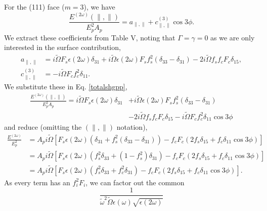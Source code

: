 For the (111) face ($m = 3$), we have 
\begin{equation}\label{totalshgpp} %
\frac{E^{(2\omega)}(\parallel,\parallel)}{E^{2}_{p}A_{p}}
= a_{\parallel,\parallel} + c^{(3)}_{\parallel,\parallel}\cos3\phi.
\end{equation}
We extract these coefficients from Table V, noting that $\Gamma = \gamma = 0$
as we are only interested in the surface contribution,
\begin{align*}
a_{\parallel,\parallel}
&= i\tilde{\Omega}F_{s}\epsilon(2\omega)\delta_{31}
 + i\tilde{\Omega}\epsilon(2\omega)F_{s}f^{2}_{s}(\delta_{33} - \delta_{31})
 - 2i\tilde{\Omega}f_{s}f_{c}F_{c}\delta_{15},\\
c^{(3)}_{\parallel,\parallel} &= -i\tilde{\Omega}F_{c}f^{2}_{c}\delta_{11}.
\end{align*}
We substitute these in Eq. \eqref{totalshgpp},
\begin{equation*}
\begin{split}
\frac{E^{(2\omega)}(\parallel,\parallel)}{E^{2}_{p}A_{p}}
 = i\tilde{\Omega}F_{s}\epsilon(2\omega)\delta_{31} 
&+ i\tilde{\Omega}\epsilon(2\omega)F_{s}f^{2}_{s}(\delta_{33} - \delta_{31})\\ 
&- 2i\tilde{\Omega}f_{s}f_{c}F_{c}\delta_{15}
 - i\tilde{\Omega}F_{c}f^{2}_{c}\delta_{11}\cos3\phi
\end{split}
\end{equation*}
and reduce (omitting the $(\parallel,\parallel)$ notation),
\begin{equation*}
\begin{split}
\frac{E^{(2\omega)}}{E^{2}_{p}}
&= A_{p}i\tilde{\Omega}
   \left[
   F_{s}\epsilon(2\omega)(\delta_{31} + f^{2}_{s}(\delta_{33} - \delta_{31}))
    - f_{c}F_{c}(2f_{s}\delta_{15} + f_{c}\delta_{11}\cos3\phi)
   \right]\\
&= A_{p}i\tilde{\Omega}
   \left[
   F_{s}\epsilon(2\omega)(f^{2}_{s}\delta_{33} + (1 - f^{2}_{s})\delta_{31})
   - f_{c}F_{c}(2f_{s}\delta_{15} + f_{c}\delta_{11}\cos3\phi)
   \right]\\
&= A_{p}i\tilde{\Omega}
   \left[
   F_{s}\epsilon(2\omega)(f^{2}_{s}\delta_{33} + f^{2}_{c}\delta_{31}) 
   - f_{c}F_{c}(2f_{s}\delta_{15} + f_{c}\delta_{11}\cos3\phi)
   \right].
\end{split}
\end{equation*}
As every term has an $f^{2}_{i}F_{i}$, we can factor out the common
\begin{equation*}
\frac{1}
{\tilde{\omega}^2\tilde{\Omega}\epsilon(\omega)\sqrt{\epsilon(2\omega)}}
\end{equation*}
